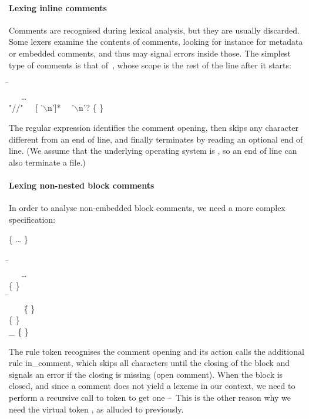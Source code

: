 \documentclass[12pt,a4paper]{article}
\begin{document}
\paragraph{Lexing inline comments}

Comments are recognised during lexical analysis, but they are usually
discarded. Some lexers examine the contents of comments, looking for
instance for metadata or embedded comments, and thus may signal errors
inside those. The simplest type of comments is that of~\Cpp{}, whose
scope is the rest of the line after it starts:
\begin{tabbing}
\Xrule \=  \equal \Xparse\\
\> \ \ \ \ldots\\
\> \vbar{} \textsf{"//"\ \ \ [ '\(\backslash\)n']*
  \ \ '\(\backslash\)n'?} \{   \}
\end{tabbing}
The regular expression identifies the comment opening, then skips any
character different from an end of line, and finally terminates by
reading an optional end of line. (We assume that the underlying
operating system is \Unix, so an end of line can also terminate a
file.)

\paragraph{Lexing non-nested block comments}

In order to analyse non\hyp{}embedded block comments, we need a more
complex specification:
\begin{tabbing}
\{ \ldots{} \Xexception {} \}\\
\\
\Xrule \=  \equal \Xparse\\
\> \ \ \ \ldots\\
\> \vbar{} \str{/*} \{   \}\\
\Xand \=  \equal \Xparse\\
\> \ \ \ \str{*/} \= \{   \}\\
\> \vbar{}  \> \{   \}\\
\> \vbar{} {\large \_} \> \{   \}
\end{tabbing}
The rule \textsf{token} recognises the comment opening and its action
calls the additional rule \textsf{in\_comment}, which skips all
characters until the closing of the block and signals an error if the
closing is missing (open comment). When the block is closed, and since
a comment does not yield a lexeme in our context, we need to perform a
recursive call to \textsf{token} to get one --~This is the other
reason why we need the virtual token \Teof, as alluded to previously.
\end{document}

